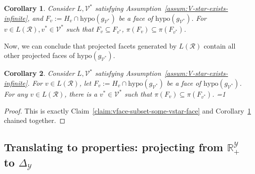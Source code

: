 \documentclass[11pt]{article}
\newcommand{\Comments}{1}
\newcommand{\mytodo}[2]{\ifnum\Comments=1%
  \todo[linecolor=#1!80!black,backgroundcolor=#1,bordercolor=#1!80!black]{#2}\fi}
\newcommand{\btw}[1]{\mytodo{gray!20!white}{BTW: #1}}%
\newcommand{\reals}{\mathbb{R}}
\newcommand{\simplex}{\Delta_\Y}
\newcommand{\R}{\mathcal{R}}
\newcommand{\V}{\mathcal{V}}
\newcommand{\Y}{\mathcal{Y}}
\newcommand{\hyp}{\mathrm{hypo}}
\newtheorem{corollary}{Corollary}
\begin{document}
\begin{corollary}\label{cor:projected-faces-subset-projected-facet}
	Consider $L, \V^*$ satisfying Assumption~\ref{assum:V-star-exists-infinite}, and $F_v := H_v \cap \hyp(g_{\V^*})$ be a face of $\hyp(g_{\V^*})$.
	For $v \in L(\R),v^* \in \V^*$ such that $F_v \subseteq F_{v^*}$, $\pi(F_{v}) \subseteq \pi(F_{v^*})$. 
\end{corollary}

Now, we can conclude that projected facets generated by $L(\R)$ contain all other projected faces of $\hyp(g_{\V^*})$.
\begin{corollary}\label{cor:exists-vstar-projected-face-subset}
	Consider $L, \V^*$ satisfying Assumption~\ref{assum:V-star-exists-infinite}.
	For $v \in L(\R)$, let $F_v := H_v \cap \hyp(g_{\V^*})$ be a face of $\hyp(g_{\V^*})$. 
	For any $v \in L(\R)$, there is a $v^* \in \V^*$ such that $\pi(F_v) \subseteq \pi(F_{v^*})$.
	\btw{shows (7) on $\reals^\Y_+$}
\end{corollary}
\begin{proof}
	This is exactly Claim~\ref{claim:vface-subset-some-vstar-face} and Corollary~\ref{cor:projected-faces-subset-projected-facet} chained together.
\end{proof}





\subsection{Translating to properties: projecting from $\reals^\Y_+$ to $\simplex$}\label{subsec:project-f}

\end{document}
